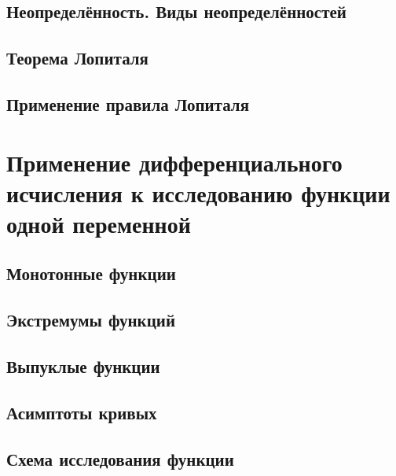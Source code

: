 \subsection{Неопределённость. Виды неопределённостей}

\subsection{Теорема Лопиталя}
%
\subsection{Применение правила Лопиталя}

\section{Применение дифференциального исчисления к исследованию функции одной переменной}
\subsection{Монотонные функции}

\subsection{Экстремумы функций} 

\subsection{Выпуклые функции}
\subsection{Асимптоты кривых}
\subsection{Схема исследования функции}



